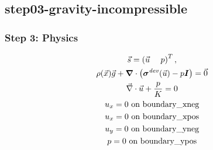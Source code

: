 \documentclass[aspectratio=169]{beamer}
\begin{document}
\subsection{step03-gravity-incompressible}

\begin{frame}
  \frametitle{Step 3: Physics}
  \summary{}

  \begin{minipage}{0.3\textwidth}
    {\scriptsize
    \begin{gather*}
      \vec{s} = \left( \vec{u} \quad \ p \right)^T, \\
      \rho(\vec{x})\vec{g} + \bm{\nabla} \cdot \left(\bm{\sigma}^\mathit{dev}(\vec{u}) - p\bm{I}\right) = \vec{0} \\
      \vec{\nabla} \cdot \vec{u} + \frac{p}{K} = 0 \\
      u_x = 0 \text{ on boundary\_xneg} \\
      u_x = 0 \text{ on boundary\_xpos} \\
      u_y = 0 \text{ on boundary\_yneg} \\
      p = 0 \text{ on boundary\_ypos}
    \end{gather*}}
  \end{minipage}
  \hfill
  \begin{minipage}{0.67\textwidth}
  \end{minipage}
      
\end{frame}
\end{document}
